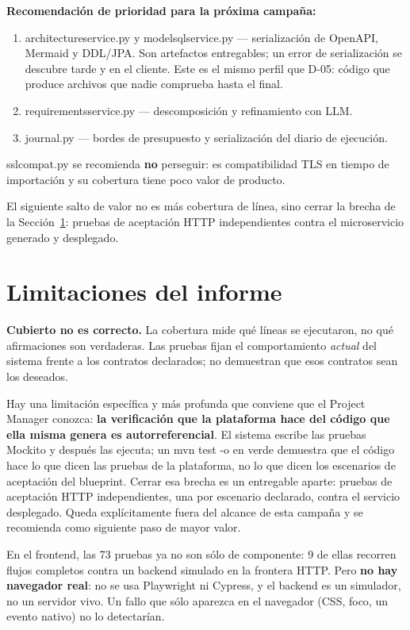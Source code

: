 \documentclass[11pt,a4paper]{article}
\newcommand{\code}[1]{{\ttfamily\small\def\_{\textunderscore\allowbreak}#1}}
\begin{document}
\noindent
\textbf{Recomendación de prioridad para la próxima campaña:}

\begin{enumerate}[leftmargin=1.6em]
\item \code{architecture\_service.py} y \code{model\_sql\_service.py} --- serialización de
      OpenAPI, Mermaid y DDL/JPA. Son artefactos entregables; un error de serialización se
      descubre tarde y en el cliente. Este es el mismo perfil que D-05: código que produce
      archivos que nadie comprueba hasta el final.
\item \code{requirements\_service.py} --- descomposición y refinamiento con LLM.
\item \code{journal.py} --- bordes de presupuesto y serialización del diario de ejecución.
\end{enumerate}

\noindent
\code{ssl\_compat.py} se recomienda \textbf{no} perseguir: es compatibilidad TLS en tiempo de
importación y su cobertura tiene poco valor de producto.

\noindent
El siguiente salto de valor no es más cobertura de línea, sino cerrar la brecha de la
Sección~\ref{sec:limitaciones}: pruebas de aceptación HTTP independientes contra el
microservicio generado y desplegado.

\section{Limitaciones del informe}
\label{sec:limitaciones}

\begin{finding}
\textbf{Cubierto no es correcto.} La cobertura mide qué líneas se ejecutaron, no qué
afirmaciones son verdaderas. Las pruebas fijan el comportamiento \emph{actual} del sistema
frente a los contratos declarados; no demuestran que esos contratos sean los deseados.
\end{finding}

\noindent
Hay una limitación específica y más profunda que conviene que el Project Manager conozca:
\textbf{la verificación que la plataforma hace del código que ella misma genera es
autorreferencial}. El sistema escribe las pruebas Mockito y después las ejecuta; un
\code{mvn test -o} en verde demuestra que el código hace lo que dicen las pruebas de la
plataforma, no lo que dicen los escenarios de aceptación del blueprint. Cerrar esa brecha es
un entregable aparte: pruebas de aceptación HTTP independientes, una por escenario declarado,
contra el servicio desplegado. Queda explícitamente fuera del alcance de esta campaña y se
recomienda como siguiente paso de mayor valor.

\vspace{0.4cm}
\noindent
En el frontend, las 73 pruebas ya no son sólo de componente: 9 de ellas recorren flujos
completos contra un backend simulado en la frontera HTTP. Pero \textbf{no hay navegador
real}: no se usa Playwright ni Cypress, y el backend es un simulador, no un servidor vivo.
Un fallo que sólo aparezca en el navegador (CSS, foco, un evento nativo) no lo detectarían.
\end{document}
